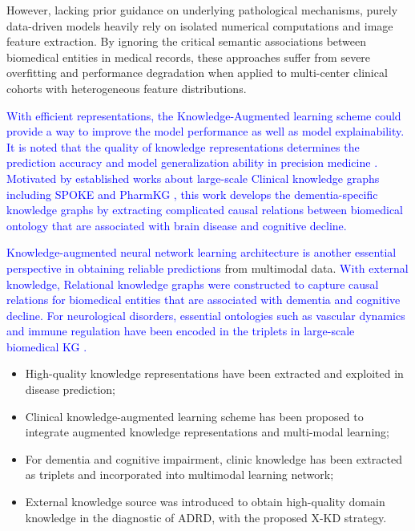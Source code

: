 \documentclass[lettersize,journal]{IEEEtran}
\begin{document}
    However, lacking prior guidance on underlying pathological mechanisms, purely data-driven models heavily rely on isolated numerical computations and image feature extraction. By ignoring the critical semantic associations between biomedical entities in medical records, these approaches suffer from severe overfitting and performance degradation\cite{lu2021knowledge} when applied to multi-center clinical cohorts with heterogeneous feature distributions.

    \textcolor{blue}{With efficient representations, the Knowledge-Augmented learning scheme could provide a way to improve the model performance as well as model explainability. It is noted that the quality of knowledge representations determines the prediction accuracy and model generalization ability in precision medicine \cite{chandak2023building}.}  \textcolor{blue}{Motivated by established works about large-scale Clinical knowledge graphs including SPOKE \cite{morris2023spoke} and PharmKG \cite{zheng2021pharmkg}, this work develops the dementia-specific knowledge graphs by extracting complicated causal relations between biomedical ontology that are associated with brain disease and cognitive decline.}

    \textcolor{blue}{Knowledge-augmented neural network learning architecture is another essential perspective in obtaining reliable predictions} from multimodal data. \textcolor{blue}{With external knowledge, Relational knowledge graphs were constructed to capture causal relations for biomedical entities that are associated with dementia and cognitive decline. For neurological disorders, essential ontologies such as vascular dynamics and immune regulation have been encoded in the triplets in large-scale biomedical KG \cite{zhao2026kgt,sim2024gtad}.}
    
\begin{itemize}
    \item High-quality knowledge representations have been extracted and exploited in disease prediction;
    \item Clinical knowledge-augmented learning scheme has been proposed to integrate augmented knowledge representations and multi-modal learning;
    \item  For dementia and cognitive impairment, clinic knowledge has been extracted as triplets and incorporated into multimodal learning network;
    \item External knowledge source was introduced to obtain high-quality domain knowledge in the diagnostic of ADRD, with the proposed X-KD strategy.
\end{itemize}
\end{document}
